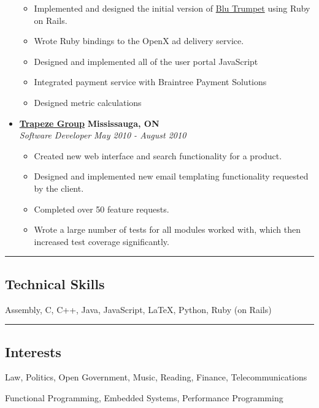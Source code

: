 \documentclass[10pt,letterpaper]{article}
\begin{document}
\begin{itemize}
    \begin{itemize}[label=\textbullet]
      \itemsep0em
      \item Implemented and designed the initial version of
            \href{http://www.blutrumpet.com/}{Blu Trumpet} using Ruby on Rails.
      \item Wrote Ruby bindings to the OpenX ad delivery service.
      \item Designed and implemented all of the user portal JavaScript
      \item Integrated payment service with Braintree Payment Solutions
      \item Designed metric calculations
    \end{itemize}

    \item[]
    {\href{http://www.trapezegroup.com/}{\textbf{Trapeze Group}} \hfill
      \textbf{Mississauga, ON}}
    \\
    {\emph{Software Developer} \hfill \emph{May 2010 - August 2010}}

    \begin{itemize}[label=\textbullet]
      \itemsep0em
      \item Created new web interface and search functionality for a product.
      \item Designed and implemented new email templating functionality
            requested by the client.
      \item Completed over 50 feature requests.
      \item Wrote a large number of tests for all modules worked with, which
            then increased test coverage significantly.
    \end{itemize}
  \end{itemize}


\hrule
\vspace{-0.4em}
\subsection*{Technical Skills}
\begin{description}[labelindent=\parindent]
  \item[Languages:]
  Assembly, C, C++, Java, JavaScript, \LaTeX, Python, Ruby (on Rails)
\end{description}

\hrule
\vspace{-0.4em}
\subsection*{Interests}
\begin{description}[labelindent=\parindent]
  \item[Personal:]
  Law, Politics, Open Government, Music, Reading, Finance, Telecommunications
  \item[Technical:]
  Functional Programming, Embedded Systems, Performance Programming
\end{description}
\end{document}
